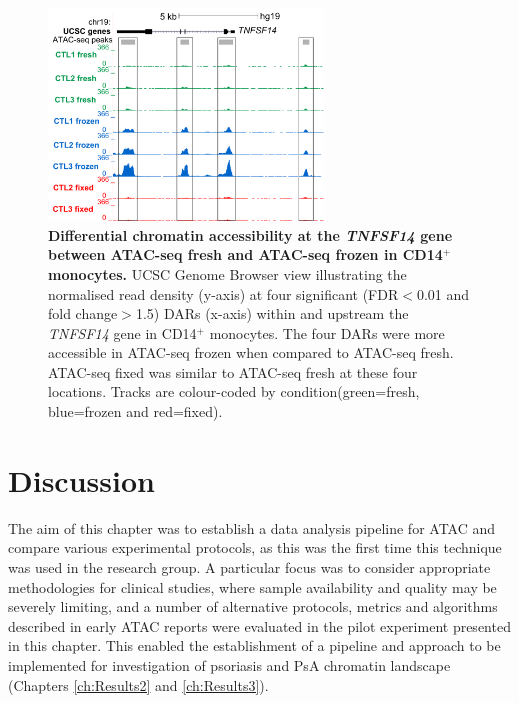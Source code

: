 	
\begin{figure}[htbp]
\centering
\includegraphics[width=0.65\textwidth]{./Results1/pdfs/Core_CD14_TNFSF14_track_UCSC}
\caption[Differential chromatin accessibility at the \textit{TNFSF14} gene between ATAC-seq fresh and ATAC-seq frozen in CD14$^+$ monocytes.]{\textbf{Differential chromatin accessibility at the \textit{TNFSF14} gene between ATAC-seq fresh and ATAC-seq frozen in CD14$^+$ monocytes.} UCSC Genome Browser view illustrating the normalised read density (y-axis) at four significant (FDR$<$0.01 and fold change$>$1.5) DARs (x-axis) within and upstream the \textit{TNFSF14} gene in CD14$^+$ monocytes. The four DARs were more accessible in ATAC-seq frozen when compared to ATAC-seq fresh. ATAC-seq fixed was similar to ATAC-seq fresh at these four locations. Tracks are colour-coded by condition(green=fresh, blue=frozen and red=fixed).}
\label{figure:Core_CD14_differential_TNFSF14}
\end{figure} 	



\section{Discussion}

The aim of this chapter was to establish a data analysis pipeline for ATAC and compare various experimental protocols, as this was the first time this technique was used in the research group. A particular focus was to consider appropriate methodologies for clinical studies, where sample availability and quality may be severely limiting, and a number of alternative protocols, metrics and algorithms described in early ATAC reports were evaluated in the pilot experiment presented in this chapter. This enabled the establishment of a pipeline and approach to be implemented for investigation of psoriasis and PsA chromatin landscape (Chapters \ref{ch:Results2} and \ref{ch:Results3}).

